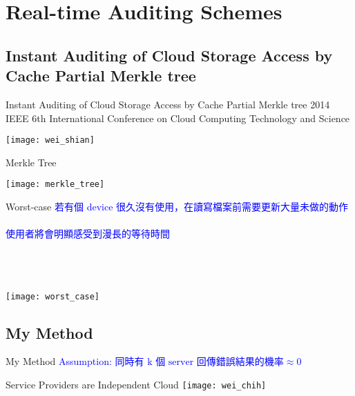 \section{Real-time Auditing Schemes}

\subsection{Instant Auditing of Cloud Storage Access by Cache Partial Merkle tree}
\begin{frame}{\normalsize{Instant Auditing of Cloud Storage Access by Cache Partial Merkle tree}}
{\tiny{2014 IEEE 6th International Conference on Cloud Computing Technology and Science}}
	\begin{center}
		\texttt{[image: wei\_shian]}
	\end{center}
\end{frame}

\begin{frame}{Merkle Tree}
	\begin{center}
		\texttt{[image: merkle\_tree]}
	\end{center}
\end{frame}

\begin{frame}{Worst-case}
	\textcolor{blue}{若有個 device 很久沒有使用，在讀寫檔案前需要更新大量未做的動作\\
	~\\
	使用者將會明顯感受到漫長的等待時間}\\
	~\\
	~\\
	~\\
	\begin{center}
		\texttt{[image: worst\_case]}
	\end{center}
\end{frame}

\subsection{My Method}
\begin{frame}{My Method}
	\textcolor{blue}{Assumption: $\text{同時有 k 個 server 回傳錯誤結果的機率} \approx 0$}
	\begin{center}
		\alert{Service Providers are Independent Cloud}
		\texttt{[image: wei\_chih]}
	\end{center}
\end{frame}

